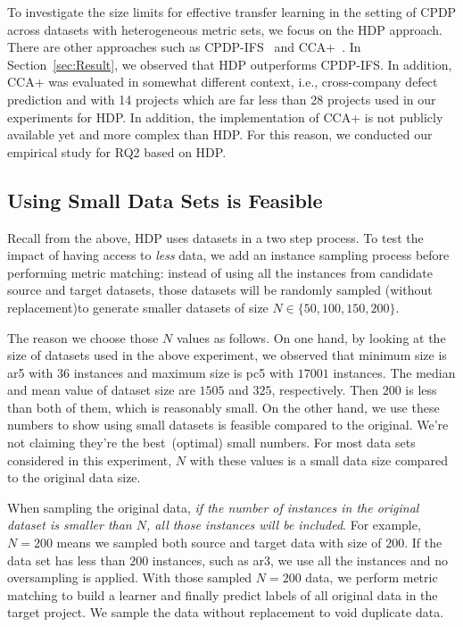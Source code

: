 To investigate the size limits for effective transfer learning in the setting of CPDP across datasets with heterogeneous metric sets, we focus on the HDP approach. There are other approaches such as CPDP-IFS~\cite{He14} and CCA+~\cite{Jing15}. In Section~\ref{sec:Result}, we observed that HDP outperforms CPDP-IFS. In addition, CCA+ was evaluated in somewhat different context, i.e., cross-company defect prediction and with 14 projects which are far less than 28 projects used in our experiments for HDP. In addition, the implementation of CCA+ is not publicly available yet and more complex than HDP. For this reason, we conducted our empirical study for RQ2 based on HDP.



 
\subsection{Using Small Data Sets is Feasible}

Recall from the above,
HDP uses  datasets  in a two step process.
To test the impact of having access to {\em less} data,
we  add an instance sampling process before performing metric matching:
instead of using all the instances from
candidate source and target datasets, those datasets will
be randomly sampled (without replacement)to generate smaller datasets of
size $N \in \{50, 100, 150, 200\}$. 

The reason we choose those $N$ values as follows. On one hand, by looking at the size of datasets used in the
above experiment, we observed that minimum size is ar5 with $36$ instances and maximum size is pc5 with $17001$ instances.
The median and mean value of dataset size are $1505$ and $325$, respectively. Then $200$ is less than both of 
them, which is reasonably small.
On the other hand, we use these numbers to show using small datasets is feasible compared to
the original. We're not claiming they're the best~(optimal) small numbers. For most data sets considered in this experiment, $N$ with these values is a 
small data size compared to the original data size. 

When sampling the original data, {\it if
the number of instances in the original dataset is
smaller than $N$, all those instances will be
included}. For example, $N=200$ means we sampled both source and target data with size of $200$. If the data set has less than $200$ instances, such as ar3, we use all
the instances and no oversampling is applied. With those sampled $N=200$ data, we perform metric matching to build a learner
and finally predict labels of all original data in the target project. We sample the data without replacement
to void duplicate data.

